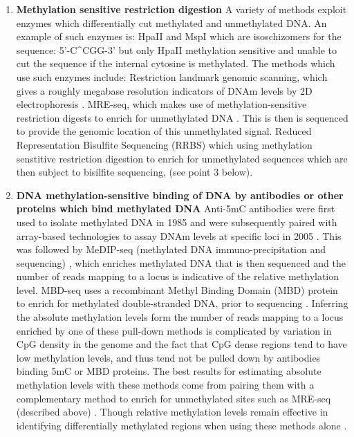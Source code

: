\documentclass[]{book}
\begin{document}
\begin{enumerate}
\def\labelenumi{\arabic{enumi}.}
\item
  \textbf{Methylation sensitive restriction digestion}
  A variety of methods exploit enzymes which differentially cut methylated and unmethylated DNA. An example of such enzymes is: HpaII and MspI which are isoschizomers for the sequence: 5'-C\^{}CGG-3' but only HpaII methylation sensitive and unable to cut the sequence if the internal cytosine is methylated. The methods which use such enzymes include: Restriction landmark genomic scanning, which gives a roughly megabase resolution indicators of DNAm levels by 2D electrophoresis \citep{Hatada1991}. MRE-seq, which makes use of methylation-sensitive restriction digests to enrich for unmethylated DNA \citep{Maunakea2010}. This is then is sequenced to provide the genomic location of this unmethylated signal. Reduced Representation Bisulfite Sequencing (RRBS) which using methylation senstitive restriction digestion to enrich for unmethylated sequences which are then subject to bisilfite sequencing, (see point 3 below).
\item
  \textbf{DNA methylation-sensitive binding of DNA by antibodies or other proteins which bind methylated DNA}
  Anti-5mC antibodies were first used to isolate methylated DNA in 1985 and were subsequently paired with array-based technologies to assay DNAm levels at specific loci in 2005 \citep[\citet{Harrison2011}]{Weber2005}. This was followed by MeDIP-seq (methylated DNA immuno-precipitation and sequencing) \citep[\citet{Lienhard2014}]{Down2009}, which enriches methylated DNA that is then sequenced and the number of reads mapping to a locus is indicative of the relative methylation level. MBD-seq uses a recombinant Methyl Binding Domain (MBD) protein to enrich for methylated double-stranded DNA, prior to sequencing \citep{Serre2009a}. Inferring the absolute methylation levels form the number of reads mapping to a locus enriched by one of these pull-down methods is complicated by variation in CpG density in the genome and the fact that CpG dense regions tend to have low methylation levels, and thus tend not be pulled down by antibodies binding 5mC or MBD proteins. The best results for estimating absolute methylation levels with these methods come from pairing them with a complementary method to enrich for unmethylated sites such as MRE-seq (described above) \citep{Li2015}. Though relative methylation levels remain effective in identifying differentially methylated regions when using these methods alone \citep[\citet{Maunakea2010}]{Bock2010}.

\end{enumerate}
\end{document}
